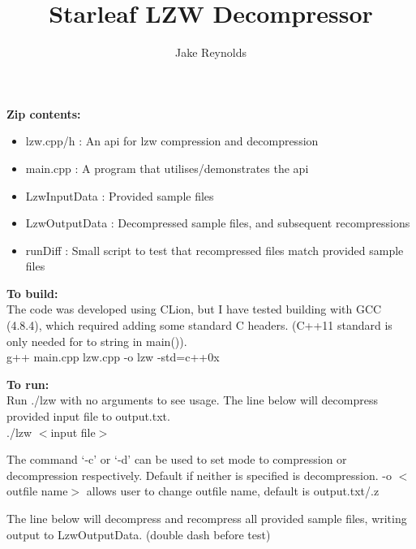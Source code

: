 \documentclass{article}
\begin{document}
\title{Starleaf LZW Decompressor}
\author{Jake Reynolds}

\maketitle

\vspace{\baselineskip} \noindent
\textbf{Zip contents:}
\begin{itemize}
    \item lzw.cpp/h : An api for lzw compression and decompression
    \item main.cpp : A program that utilises/demonstrates the api
    \item LzwInputData : Provided sample files
    \item LzwOutputData : Decompressed sample files, and subsequent recompressions
    \item runDiff : Small script to test that recompressed files match provided sample files
\end{itemize}

\vspace{\baselineskip} \noindent
\textbf{To build:} \\
The code was developed using CLion, but I have tested building with GCC (4.8.4), which required adding some standard C headers. (C++11 standard is only needed for to string in main()).\\

g++ main.cpp lzw.cpp  -o lzw -std=c++0x

\vspace{\baselineskip} \noindent
\textbf{To run:} \\
Run ./lzw with no arguments to see usage. The line below will decompress provided input file to output.txt. \\

./lzw $<$input file$>$

\vspace{\baselineskip} \noindent
The command `-c' or `-d' can be used to set mode to compression or decompression respectively. Default if neither is specified is decompression. -o $<$outfile name$>$ allows user to change outfile name, default is output.txt/.z

\vspace{\baselineskip} \noindent
The line below will decompress and recompress all provided sample files, writing output to LzwOutputData. (double dash before test) \\
\end{document}
